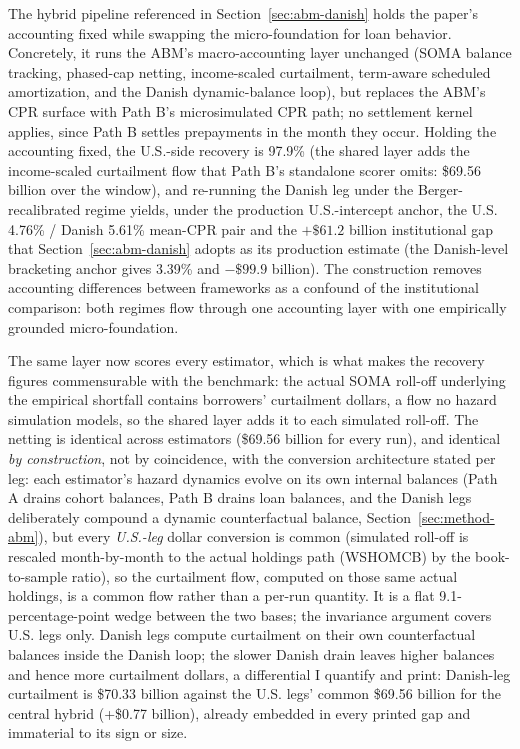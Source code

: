 \documentclass[12pt]{article}
\begin{document}
The hybrid pipeline referenced in Section~\ref{sec:abm-danish} holds the paper's accounting fixed while swapping the micro-foundation for loan behavior. Concretely, it runs the ABM's macro-accounting layer unchanged (SOMA balance tracking, phased-cap netting, income-scaled curtailment, term-aware scheduled amortization, and the Danish dynamic-balance loop), but replaces the ABM's CPR surface with Path B's microsimulated CPR path; no settlement kernel applies, since Path B settles prepayments in the month they occur. Holding the accounting fixed, the U.S.-side recovery is 97.9\% (the shared layer adds the income-scaled curtailment flow that Path B's standalone scorer omits: \$69.56 billion over the window), and re-running the Danish leg under the Berger-recalibrated regime yields, under the production U.S.-intercept anchor, the U.S. 4.76\% / Danish 5.61\% mean-CPR pair and the $+\$61.2$ billion institutional gap that Section~\ref{sec:abm-danish} adopts as its production estimate (the Danish-level bracketing anchor gives 3.39\% and $-\$99.9$ billion). The construction removes accounting differences between frameworks as a confound of the institutional comparison: both regimes flow through one accounting layer with one empirically grounded micro-foundation.

The same layer now scores every estimator, which is what makes the recovery figures commensurable with the benchmark: the actual SOMA roll-off underlying the empirical shortfall contains borrowers' curtailment dollars, a flow no hazard simulation models, so the shared layer adds it to each simulated roll-off. The netting is identical across estimators (\$69.56 billion for every run), and identical \emph{by construction}, not by coincidence, with the conversion architecture stated per leg: each estimator's hazard dynamics evolve on its own internal balances (Path A drains cohort balances, Path B drains loan balances, and the Danish legs deliberately compound a dynamic counterfactual balance, Section~\ref{sec:method-abm}), but every \emph{U.S.-leg} dollar conversion is common (simulated roll-off is rescaled month-by-month to the actual holdings path (WSHOMCB) by the book-to-sample ratio), so the curtailment flow, computed on those same actual holdings, is a common flow rather than a per-run quantity. It is a flat 9.1-percentage-point wedge between the two bases; the invariance argument covers U.S. legs only. Danish legs compute curtailment on their own counterfactual balances inside the Danish loop; the slower Danish drain leaves higher balances and hence more curtailment dollars, a differential I quantify and print: Danish-leg curtailment is \$70.33 billion against the U.S. legs' common \$69.56 billion for the central hybrid (+\$0.77 billion), already embedded in every printed gap and immaterial to its sign or size.
\end{document}
